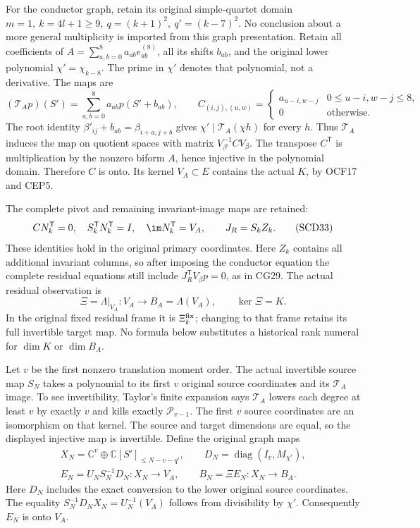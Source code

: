 \documentclass[11pt,a4paper]{article}
\theoremstyle{definition}\newtheorem{definition}[theorem]{Definition}
\newcommand{\C}{\mathbb C}\newcommand{\R}{\mathbb R}
\newcommand{\Pp}{\mathcal P}\newcommand{\LL}{\mathcal L}
\begin{document}
For the conductor graph, retain its original simple-quartet domain
\(m=1,\ k=4l+1\ge9,\ q=(k+1)^2,\ q'=(k-7)^2\).
No conclusion about a more general multiplicity is imported from
this graph presentation. Retain all coefficients of
\(A=\sum_{a,b=0}^8a_{ab}e_{ab}^{(8)}\), all its shifts \(b_{ab}\),
and the original lower polynomial \(\chi'=\chi_{k-8}\). The prime
in \(\chi'\) denotes that polynomial, not a derivative. The maps are
\[
 (\mathcal T_Ap)(S')=\sum_{a,b=0}^8a_{ab}p(S'+b_{ab}),\qquad
 C_{(i,j),(u,w)}=
 \begin{cases}a_{u-i,w-j}&0\le u-i,w-j\le8,\\
 0&\text{otherwise}.
 \end{cases}
 \tag{SCD32}
\]
The root identity \(\beta'_{ij}+b_{ab}=\beta_{i+a,j+b}\)
gives \(\chi'\mid\mathcal T_A(\chi h)\) for every \(h\).
Thus \(\mathcal T_A\) induces the map on quotient spaces with
matrix \(V_{\beta'}^{-1}CV_\beta\). The transpose \(C^{\mathsf T}\)
is multiplication by the nonzero biform \(A\), hence injective
in the polynomial domain. Therefore \(C\) is onto. Its kernel
\(V_A\subset E\) contains the actual \(K\), by OCF17 and CEP5.

The complete pivot and remaining invariant-image maps are retained:
\[
 CN_k^{\mathsf T}=0,\quad
 S_k^{\mathsf T}N_k^{\mathsf T}=I,\quad
 \im N_k^{\mathsf T}=V_A,\qquad J_R=S_kZ_k .
 \tag{SCD33}
\]
These identities hold in the original primary coordinates.
Here \(Z_k\) contains all additional invariant columns, so after
imposing the conductor equation the complete residual equations
still include \(J_R^{\mathsf T}V_\beta p=0\), as in CG29.
The actual residual observation is
\[
 \Xi=\Lambda|_{V_A}:V_A\to B_A=\Lambda(V_A),\qquad\ker\Xi=K.
\]
In the original fixed residual frame it is \(\Xi_k^{\rm fix}\);
changing to that frame retains its full invertible target map.
No formula below substitutes a historical rank numeral for
\(\dim K\) or \(\dim B_A\).

Let \(v\) be the first nonzero translation moment order. The actual
invertible source map \(S_N\) takes a polynomial to its first \(v\)
original source coordinates and its \(\mathcal T_A\) image.
To see invertibility, Taylor's finite expansion says
\(\mathcal T_A\) lowers each degree at least \(v\) by exactly \(v\)
and kills exactly \(\Pp_{v-1}\). The first \(v\) source coordinates
are an isomorphism on that kernel. The source and target dimensions
are equal, so the displayed injective map is invertible.
Define the original graph maps
\[
 \begin{gathered}
 X_N=\C^v\oplus\C[S']_{\le N-v-q'},\qquad
 D_N=\operatorname{diag}(I_v,M_{\chi'}),\\
 E_N=U_NS_N^{-1}D_N:X_N\to V_A,\qquad
 B_N=\Xi E_N:X_N\to B_A .
 \end{gathered}
 \tag{SCD34}
\]
Here \(D_N\) includes the exact conversion to the lower original
source coordinates. The equality
\(S_N^{-1}D_NX_N=U_N^{-1}(V_A)\) follows from divisibility by
\(\chi'\). Consequently \(E_N\) is onto \(V_A\).
\end{document}
